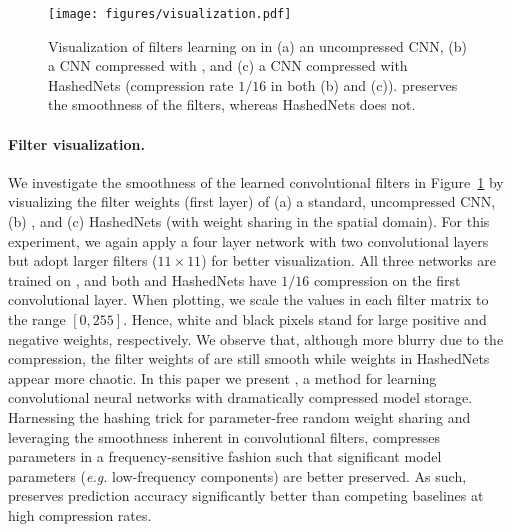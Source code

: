 \documentclass{article} %
\begin{document}
\begin{figure}
	\center
    \texttt{[image: figures/visualization.pdf]} 
    \caption{Visualization of filters learning on  in (a) an uncompressed CNN, (b) a CNN compressed with \abbrev{}, and (c) a CNN compressed with HashedNets (compression rate $1/16$ in both (b) and (c)). \abbrev{} preserves the smoothness of the filters, whereas  HashedNets does not.}
    \label{fig:visual}
\end{figure}\paragraph{Filter visualization.}
We investigate the smoothness of the learned convolutional filters in Figure~\ref{fig:visual} by visualizing the filter weights (first layer) of (a) a standard, uncompressed CNN, (b) \abbrev{}, and (c) HashedNets (with weight sharing in the spatial domain).
For this experiment, we again apply a four layer network with two convolutional layers but adopt larger filters ($11\times 11$) for better visualization.
All three networks are trained on , and both \abbrev{} and HashedNets have $1/16$ compression on the first convolutional layer.
When plotting, we scale the values in each filter matrix to the range $[0,255]$.
Hence, white and black pixels stand for large positive and negative weights, respectively.
We observe that, although more blurry due to the compression, the filter weights of \abbrev{} are still smooth while weights in HashedNets appear more chaotic.
In this paper we present \abbrev{}, a method for learning convolutional neural networks with dramatically compressed model storage.
Harnessing the hashing trick for parameter-free random weight sharing and leveraging the smoothness inherent in convolutional filters, \abbrev{} compresses parameters in a frequency-sensitive fashion such that significant model parameters (\emph{e.g.} low-frequency components) are better preserved.
As such, \abbrev{} preserves prediction accuracy significantly better than competing baselines at high compression rates.

{
\small


}
\end{document}
